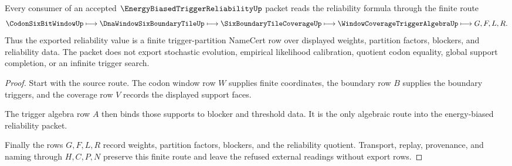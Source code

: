 \begin{theorem}
\label{thm:energy-biased-trigger-reliability-partition-route}
Every consumer of an accepted $\EnergyBiasedTriggerReliabilityUp$ packet reads the reliability formula through the finite route
$$
\CodonSixBitWindowUp \longmapsto \DnaWindowSixBoundaryTileUp \longmapsto \SixBoundaryTileCoverageUp \longmapsto \WindowCoverageTriggerAlgebraUp \longmapsto G,F,L,R .
$$
Thus the exported reliability value is a finite trigger-partition NameCert row over displayed weights, partition factors, blockers, and reliability data. The packet does not export stochastic evolution, empirical likelihood calibration, quotient codon equality, global support completion, or an infinite trigger search.
\end{theorem}
\begin{proof}
Start with the source route. The codon window row $W$ supplies finite coordinates, the boundary row $B$ supplies the boundary triggers, and the coverage row $V$ records the displayed support faces.

The trigger algebra row $A$ then binds those supports to blocker and threshold data. It is the only algebraic route into the energy-biased reliability packet.

Finally the rows $G,F,L,R$ record weights, partition factors, blockers, and the reliability quotient. Transport, replay, provenance, and naming through $H,C,P,N$ preserve this finite route and leave the refused external readings without export rows.
\end{proof}




